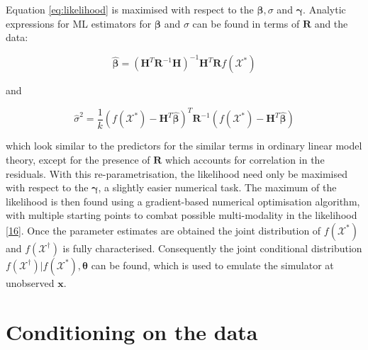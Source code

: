 \documentclass[
  12pt,
  a4paper,
  twoside]{book}
\begin{document}
Equation \eqref{eq:likelihood} is maximised with respect to the \(\mathbf{\beta}, \sigma\) and \(\mathbf{\gamma}\). Analytic expressions for ML estimators for \(\mathbf{\beta}\) and \(\sigma\) can be found in terms of \(\mathbf{R}\) and the data:

\begin{equation}
\label{eq:beta-hat}
\mathbf{\hat{\beta}} = \left( \mathbf{H}^T\mathbf{R}^{-1}\mathbf{H} \right)^{-1}\mathbf{H}^T \mathbf{R}f(\mathcal{X^*})
\end{equation}

and

\begin{equation}
\label{eq:sigma-hat}
\hat{\sigma}^2 = \frac{1}{k} \left( f(\mathcal{X^*}) - \mathbf{H}^T\mathbf{\hat{\beta}}\right)^T \mathbf{R} ^{-1}\left( f(\mathcal{X^*}) - \mathbf{H}^T\mathbf{\hat{\beta}}\right)
\end{equation}

which look similar to the predictors for the similar terms in ordinary linear model theory, except for the presence of \(\mathbf{R}\) which accounts for correlation in the residuals. With this re-parametrisation, the likelihood need only be maximised with respect to the \(\mathbf{\gamma}\), a slightly easier numerical task. The maximum of the likelihood is then found using a gradient-based numerical optimisation algorithm, with multiple starting points to combat possible multi-modality in the likelihood \protect\hyperlink{ref-dicekriging}{{[}16{]}}. Once the parameter estimates are obtained the joint distribution of \(f(\mathcal{X^*})\) and \(f(\mathcal{X^\dagger})\) is fully characterised. Consequently the joint conditional distribution \(f(\mathcal{X^\dagger})|f(\mathcal{X^*}), \mathbf{\theta}\) can be found, which is used to emulate the simulator at unobserved \(\mathbf{x}\).

\hypertarget{conditioning-on-the-data}{%
\section{Conditioning on the data}\label{conditioning-on-the-data}}
\end{document}
